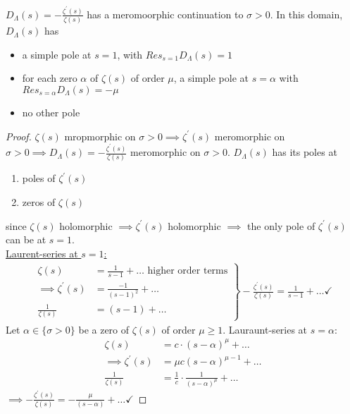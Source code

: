 \documentclass[NumTh.tex]{subfiles}
\begin{document}
\begin{lemma} \label{4_12}
  $D_\Lambda(s) =  - \frac{\zeta^\prime(s)}{\zeta(s)}$ has a meromoorphic continuation to $\sigma > 0$.
  In this domain, $D_\Lambda(s)$ has
  \begin{itemize}
    \item a simple pole at $s = 1$, with $Res_{s=1} D_\Lambda(s) = 1$
    \item for each zero $\alpha$ of $\zeta(s)$ of order $\mu$, a simple pole at $s = \alpha$ with $Res_{s=\alpha} D_\Lambda(s) = - \mu$
    \item no other pole
  \end{itemize}
\end{lemma}

\begin{proof}
  $\zeta(s)$ mropmorphic on $\sigma > 0 \implies \zeta^\prime(s)$ meromorphic on $\sigma > 0 \implies D_\Lambda(s) = - \frac{\zeta^\prime(s)}{\zeta(s)}$ meromorphic on $\sigma > 0$.
  $D_\Lambda(s)$ has its poles at
  \begin{enumerate}
    \item poles of $\zeta^\prime(s)$
    \item zeros of $\zeta(s)$
  \end{enumerate}
  since $\zeta(s)$ holomorphic $\implies \zeta^\prime(s)$ holomorphic $\implies$ the only pole of $\zeta^\prime(s)$ can be at $s = 1$.\\
  \underline{Laurent-series at $s=1$:}
  \begin{align*}
    \left.
    \begin{array}{ll}
    \zeta(s) &= \frac{1}{s-1} + \dots \text{ higher order terms} \\
    \implies \zeta^\prime(s) &= \frac{-1}{(s-1)^2} + \dots \\
    \frac{1}{\zeta(s)} &= (s-1) + \dots
    \end{array}
    \right\rbrace -\frac{\zeta^\prime(s)}{\zeta(s)} = \frac{1}{s-1} + \dots \checkmark
  \end{align*}
  Let $\alpha \in \{ \sigma >0\}$ be a zero of $\zeta(s)$ of order $\mu \geq 1$.
  Lauraunt-series at $s = \alpha$:\\
  \begin{align*}
    \zeta(s) &= c \cdot (s- \alpha)^\mu + \dots \\
    \implies \zeta^\prime(s) &= \mu c (s-\alpha)^{\mu - 1} + \dots \\
    \frac{1}{\zeta(s)} &= \frac{1}{c} \cdot \frac{1}{(s-\alpha)^\mu} + \dots
  \end{align*}
  $\implies - \frac{\zeta^\prime(s)}{\zeta(s)} = - \frac{\mu}{(s - \alpha)} + \dots \checkmark$
\end{proof}
\end{document}
